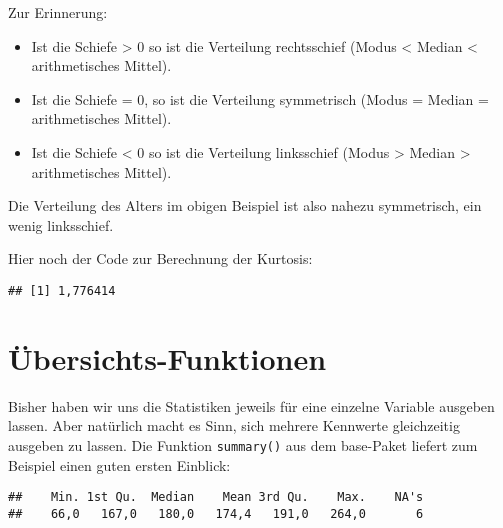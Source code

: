 \documentclass[
]{book}
\newenvironment{Shaded}{\begin{snugshade}}{\end{snugshade}}
\newcommand{\AttributeTok}[1]{\textcolor[rgb]{0.77,0.63,0.00}{#1}}
\newcommand{\ConstantTok}[1]{\textcolor[rgb]{0.00,0.00,0.00}{#1}}
\newcommand{\FunctionTok}[1]{\textcolor[rgb]{0.00,0.00,0.00}{#1}}
\newcommand{\NormalTok}[1]{#1}
\newcommand{\SpecialCharTok}[1]{\textcolor[rgb]{0.00,0.00,0.00}{#1}}
\begin{document}
Zur Erinnerung:

\begin{itemize}
\item
  Ist die Schiefe \textgreater{} 0 so ist die Verteilung rechtsschief (Modus \textless{} Median \textless{} arithmetisches Mittel).
\item
  Ist die Schiefe = 0, so ist die Verteilung symmetrisch (Modus = Median = arithmetisches Mittel).
\item
  Ist die Schiefe \textless{} 0 so ist die Verteilung linksschief (Modus \textgreater{} Median \textgreater{} arithmetisches Mittel).
\end{itemize}

Die Verteilung des Alters im obigen Beispiel ist also nahezu symmetrisch, ein wenig linksschief.

Hier noch der Code zur Berechnung der Kurtosis:

\begin{Shaded}
\end{Shaded}

\begin{verbatim}
## [1] 1,776414
\end{verbatim}

\hypertarget{uxfcbersichts-funktionen}{%
\section{Übersichts-Funktionen}\label{uxfcbersichts-funktionen}}

Bisher haben wir uns die Statistiken jeweils für eine einzelne Variable ausgeben lassen. Aber natürlich macht es Sinn, sich mehrere Kennwerte gleichzeitig ausgeben zu lassen. Die Funktion \texttt{summary()} aus dem base-Paket liefert zum Beispiel einen guten ersten Einblick:

\begin{Shaded}
\end{Shaded}

\begin{verbatim}
##    Min. 1st Qu.  Median    Mean 3rd Qu.    Max.    NA's 
##    66,0   167,0   180,0   174,4   191,0   264,0       6
\end{verbatim}
\end{document}
